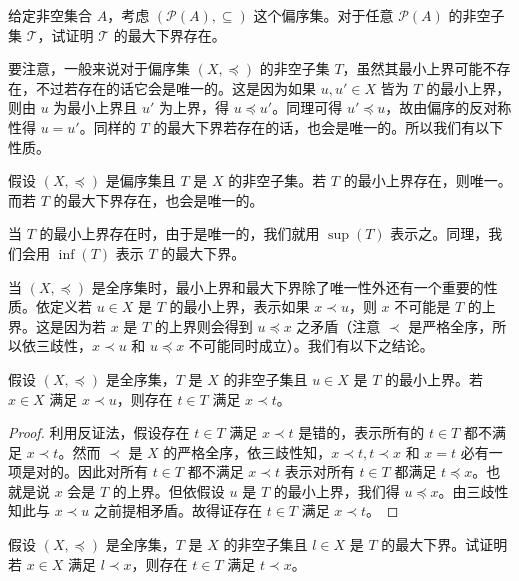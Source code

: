 \begin{question}
给定非空集合 $A$，考虑 $(\mathcal{P}(A), \subseteq)$ 这个偏序集。对于任意 $\mathcal{P}(A)$ 的非空子集 $\mathcal{T}$，试证明 $\mathcal{T}$ 的最大下界存在。
\end{question}

要注意，一般来说对于偏序集 $(X, \preceq)$ 的非空子集 $T$，虽然其最小上界可能不存在，不过若存在的话它会是唯一的。这是因为如果 $u, u' \in X$ 皆为 $T$ 的最小上界，则由 $u$ 为最小上界且 $u'$ 为上界，得 $u \preceq u'$。同理可得 $u' \preceq u$，故由偏序的反对称性得 $u = u'$。同样的 $T$ 的最大下界若存在的话，也会是唯一的。所以我们有以下性质。

\begin{proposition}
假设 $(X, \preceq)$ 是偏序集且 $T$ 是 $X$ 的非空子集。若 $T$ 的最小上界存在，则唯一。而若 $T$ 的最大下界存在，也会是唯一的。
\end{proposition}

当 $T$ 的最小上界存在时，由于是唯一的，我们就用 $\sup(T)$ 表示之。同理，我们会用 $\inf(T)$ 表示 $T$ 的最大下界。

当 $(X, \preceq)$ 是全序集时，最小上界和最大下界除了唯一性外还有一个重要的性质。依定义若 $u \in X$ 是 $T$ 的最小上界，表示如果 $x \prec u$，则 $x$ 不可能是 $T$ 的上界。这是因为若 $x$ 是 $T$ 的上界则会得到 $u \preceq x$ 之矛盾（注意 $\prec$ 是严格全序，所以依三歧性，$x \prec u$ 和 $u \preceq x$ 不可能同时成立）。我们有以下之结论。

\begin{proposition}
假设 $(X, \preceq)$ 是全序集，$T$ 是 $X$ 的非空子集且 $u \in X$ 是 $T$ 的最小上界。若 $x \in X$ 满足 $x \prec u$，则存在 $t \in T$ 满足 $x \prec t$。
\end{proposition}

\begin{proof}
利用反证法，假设存在 $t \in T$ 满足 $x \prec t$ 是错的，表示所有的 $t \in T$ 都不满足 $x \prec t$。然而 $\prec$ 是 $X$ 的严格全序，依三歧性知，$x \prec t, t \prec x$ 和 $x = t$ 必有一项是对的。因此对所有 $t \in T$ 都不满足 $x \prec t$ 表示对所有 $t \in T$ 都满足 $t \preceq x$。也就是说 $x$ 会是 $T$ 的上界。但依假设 $u$ 是 $T$ 的最小上界，我们得 $u \preceq x$。由三歧性知此与 $x \prec u$ 之前提相矛盾。故得证存在 $t \in T$ 满足 $x \prec t$。
\end{proof}

\begin{question}
假设 $(X, \preceq)$ 是全序集，$T$ 是 $X$ 的非空子集且 $l \in X$ 是 $T$ 的最大下界。试证明若 $x \in X$ 满足 $l \prec x$，则存在 $t \in T$ 满足 $t \prec x$。
\end{question}

